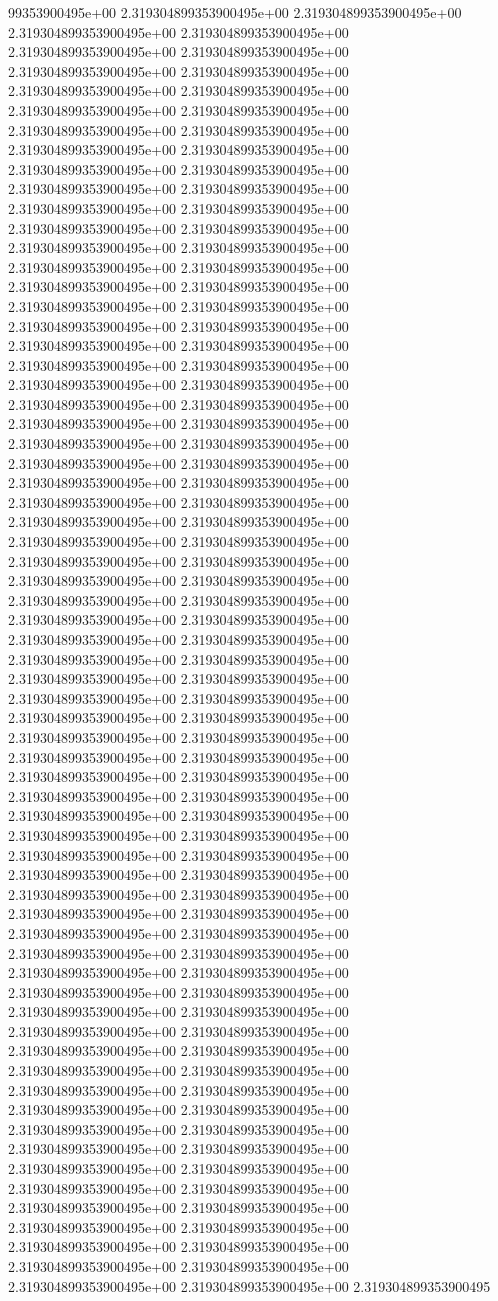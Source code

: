 99353900495e+00	2.319304899353900495e+00	2.319304899353900495e+00	2.319304899353900495e+00	2.319304899353900495e+00	2.319304899353900495e+00	2.319304899353900495e+00	2.319304899353900495e+00	2.319304899353900495e+00	2.319304899353900495e+00	2.319304899353900495e+00	2.319304899353900495e+00	2.319304899353900495e+00	2.319304899353900495e+00	2.319304899353900495e+00	2.319304899353900495e+00	2.319304899353900495e+00	2.319304899353900495e+00	2.319304899353900495e+00	2.319304899353900495e+00	2.319304899353900495e+00	2.319304899353900495e+00	2.319304899353900495e+00	2.319304899353900495e+00	2.319304899353900495e+00	2.319304899353900495e+00	2.319304899353900495e+00	2.319304899353900495e+00	2.319304899353900495e+00	2.319304899353900495e+00	2.319304899353900495e+00	2.319304899353900495e+00	2.319304899353900495e+00	2.319304899353900495e+00	2.319304899353900495e+00	2.319304899353900495e+00	2.319304899353900495e+00	2.319304899353900495e+00	2.319304899353900495e+00	2.319304899353900495e+00	2.319304899353900495e+00	2.319304899353900495e+00	2.319304899353900495e+00	2.319304899353900495e+00	2.319304899353900495e+00	2.319304899353900495e+00	2.319304899353900495e+00	2.319304899353900495e+00	2.319304899353900495e+00	2.319304899353900495e+00	2.319304899353900495e+00	2.319304899353900495e+00	2.319304899353900495e+00	2.319304899353900495e+00	2.319304899353900495e+00	2.319304899353900495e+00	2.319304899353900495e+00	2.319304899353900495e+00	2.319304899353900495e+00	2.319304899353900495e+00	2.319304899353900495e+00	2.319304899353900495e+00	2.319304899353900495e+00	2.319304899353900495e+00	2.319304899353900495e+00	2.319304899353900495e+00	2.319304899353900495e+00	2.319304899353900495e+00	2.319304899353900495e+00	2.319304899353900495e+00	2.319304899353900495e+00	2.319304899353900495e+00	2.319304899353900495e+00	2.319304899353900495e+00	2.319304899353900495e+00	2.319304899353900495e+00	2.319304899353900495e+00	2.319304899353900495e+00	2.319304899353900495e+00	2.319304899353900495e+00	2.319304899353900495e+00	2.319304899353900495e+00	2.319304899353900495e+00	2.319304899353900495e+00	2.319304899353900495e+00	2.319304899353900495e+00	2.319304899353900495e+00	2.319304899353900495e+00	2.319304899353900495e+00	2.319304899353900495e+00	2.319304899353900495e+00	2.319304899353900495e+00	2.319304899353900495e+00	2.319304899353900495e+00	2.319304899353900495e+00	2.319304899353900495e+00	2.319304899353900495e+00	2.319304899353900495e+00	2.319304899353900495e+00	2.319304899353900495e+00	2.319304899353900495e+00	2.319304899353900495e+00	2.319304899353900495e+00	2.319304899353900495e+00	2.319304899353900495e+00	2.319304899353900495e+00	2.319304899353900495e+00	2.319304899353900495e+00	2.319304899353900495e+00	2.319304899353900495e+00	2.319304899353900495e+00	2.319304899353900495e+00	2.319304899353900495e+00	2.319304899353900495e+00	2.319304899353900495e+00	2.319304899353900495e+00	2.319304899353900495e+00	2.319304899353900495e+00	2.319304899353900495e+00	2.319304899353900495e+00	2.319304899353900495e+00	2.319304899353900495e+00	2.319304899353900495e+00	2.319304899353900495e+00	2.319304899353900495e+00	2.319304899353900495e+00	2.319304899353900495e+00	2.319304899353900495e+00	2.319304899353900495e+00	2.319304899353900495e+00	2.319304899353900495e+00	2.319304899353900495e+00	2.319304899353900495e+00	2.319304899353900495
